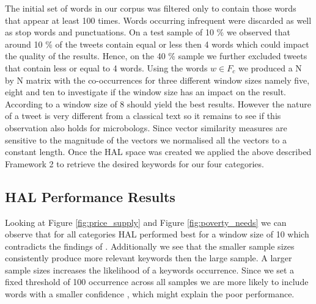 The initial set of words in our corpus was filtered only to contain those words that appear at least 100 times. Words occurring infrequent were discarded as well as stop words and punctuations. On a test sample of 10 \% we observed that around 10 \% of the tweets contain equal or less then 4 words which could impact the quality of the results. Hence, on the 40 \% sample we further excluded tweets that contain less or equal to 4 words. Using the words $w \in F_c$ we produced a N by N matrix with the co-occurrences for three different window sizes namely five, eight and ten to investigate if the window size has an impact on the result. According to \cite{lund96} a window size of 8 should yield the best results. However the nature of a tweet is very different from a classical text so it remains to see if this observation also holds for microbologs. Since vector similarity measures are sensitive to the magnitude of the vectors we normalised all the vectors to a constant length. Once the HAL space was created we applied the above described Framework 2 to retrieve the desired keywords for our four categories. 

\subsection{HAL Performance Results}


Looking at Figure \ref{fig:price_supply} and Figure \ref{fig:poverty_needs} we can observe that for all categories HAL performed best for a window size of 10 which contradicts the findings of \cite{lund96}. Additionally we see that the smaller sample sizes consistently produce more relevant keywords then the large sample.  A larger sample sizes increases the likelihood of a keywords occurrence. Since we set a fixed threshold of 100 occurrence across all samples we are more likely to include words with a smaller confidence , which might explain the poor performance. 


